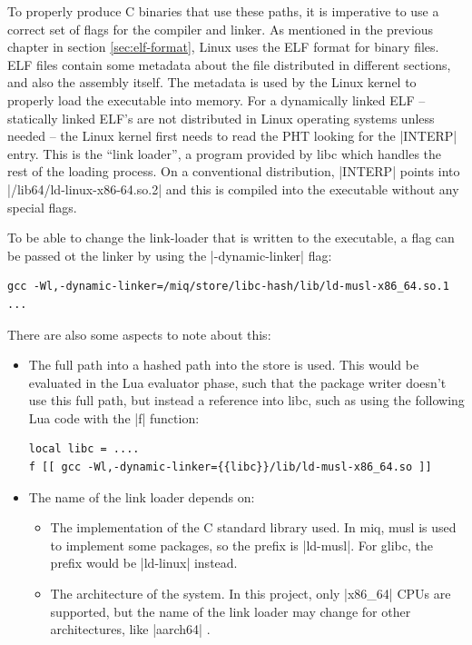 To properly produce C binaries that use these paths, it is
imperative to use a correct set of flags for the compiler
and linker. As mentioned in the previous chapter in section
\ref{sec:elf-format}, Linux uses the \acl{ELF} format for
binary files. \ac{ELF} files contain some metadata about the
file distributed in different sections, and also the
assembly itself. The metadata is used by the Linux kernel to
properly load the executable into memory. For a dynamically
linked \ac{ELF} -- statically linked \ac{ELF}'s are not
distributed in Linux operating systems unless needed -- the
Linux kernel first needs to read the \acl{PHT} looking for
the |INTERP| entry. This is the ``link loader'', a program
provided by libc which handles the rest of the loading
process. On a conventional distribution, |INTERP| points
into |/lib64/ld-linux-x86-64.so.2| and this is compiled into
the executable without any special flags.

To be able to change the link-loader that is written to the
executable, a flag \cite{GNUCompilerCollection} can be
passed ot the linker by using the |-dynamic-linker| flag:

\begin{verbatim}
gcc -Wl,-dynamic-linker=/miq/store/libc-hash/lib/ld-musl-x86_64.so.1 ...
\end{verbatim}

There are also some aspects to note about this:

\begin{itemize}
    \item The full path into a hashed path into the store is
    used. This would be evaluated in the Lua evaluator
    phase, such that the package writer doesn't use this
    full path, but instead a reference into libc, such as
    using the following Lua code with the |f| function:
\begin{verbatim}
local libc = ....
f [[ gcc -Wl,-dynamic-linker={{libc}}/lib/ld-musl-x86_64.so ]]
\end{verbatim}

    \item The name of the link loader depends on:
    \begin{itemize}
        \item The implementation of the C standard library
        used. In miq, musl is used to implement some
        packages, so the prefix is |ld-musl|. For glibc, the
        prefix would be |ld-linux| instead.

        \item The architecture of the system. In this
        project, only |x86_64| CPUs are supported, but the
        name of the link loader may change for other
        architectures, like |aarch64| .
    \end{itemize}
\end{itemize}

